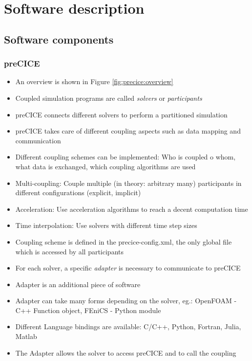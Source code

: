 \section{Software description}

\subsection{Software components}

\subsubsection{preCICE}
\begin{itemize}
	\item An overview is shown in Figure \ref{fig:precice:overview}
	\item Coupled simulation programs are called \textit{solvers} or \textit{participants}
	\item preCICE connects different solvers to perform a partitioned simulation
	\item preCICE takes care of different coupling aspects such as data mapping and communication
	\item Different coupling schemes can be implemented: Who is coupled o whom, what data is exchanged, which coupling algorithms are used \cite{Gatzhammer:2014}
	\item Multi-coupling: Couple multiple (in theory: arbitrary many) participants in different configurations (explicit, implicit)
	\item Acceleration: Use acceleration algorithms to reach a decent computation time
	\item Time interpolation: Use solvers with different time step sizes
	\item Coupling scheme is defined in the precice-config.xml, the only global file which is accessed by all participants
	\item For each solver, a specific \textit{adapter} is necessary to communicate to preCICE
	\item Adapter is an additional piece of software
	\item Adapter can take many forms depending on the solver, eg.: OpenFOAM - C++ Function object, FEniCS - Python module
	\item Different Language bindings are available: C/C++, Python, Fortran, Julia, Matlab
	\item The Adapter allows the solver to access preCICE and to call the coupling
\end{itemize}

